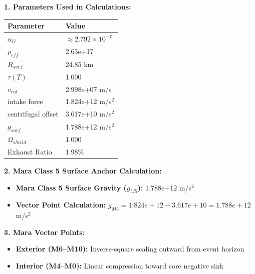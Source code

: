 \documentclass[11pt, a4paper]{article}
\begin{document}
\vspace{0.5em}
\noindent \textbf{1. Parameters Used in Calculations:}
\begin{center}
  \begin{tabular}{|l|l|}
    \hline
    \textbf{Parameter} & \textbf{Value} \\ \hline
    $\alpha_G$ & $\approx 2.792 \times 10^{-7}$ \\ \hline
    $\rho_{eff}$ & 2.63e+17 \\ \hline
    $R_{surf}$ & 24.85 km \\ \hline
    $\tau(T)$ & 1.000 \\ \hline
    $v_{rot}$ & 2.998e+07 m/s \\ \hline
    intake force & 1.824e+12 m/s$^2$ \\ \hline
    centrifugal offset & 3.617e+10 m/s$^2$ \\ \hline
    $g_{surf}$ & 1.788e+12 m/s$^2$ \\ \hline
    $\Omega_{shield}$ & 1.000 \\ \hline
    Exhaust Ratio & 1.98\% \\ \hline
  \end{tabular}
\end{center}

\vspace{0.5em}
\noindent \textbf{2. Mara Class 5 Surface Anchor Calculation:}
\begin{itemize}
  \item \textbf{Mara Class 5 Surface Gravity ($g_{M5}$):} 1.788e+12 m/s$^2$
  \item \textbf{Vector Point Calculation:} $g_{M5} = 1.824e+12 - 3.617e+10 = 1.788e+12$ m/s$^2$
\end{itemize}

\vspace{0.5em}
\noindent \textbf{3. Mara Vector Points:}
\begin{itemize}
  \item \textbf{Exterior (M6--M10):} Inverse-square scaling outward from event horizon
  \item \textbf{Interior (M4--M0):} Linear compression toward core negative sink
\end{itemize}
\end{document}
